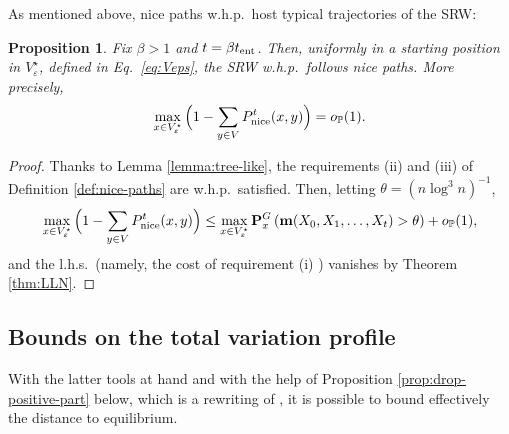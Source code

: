 \documentclass[11pt,oneside]{amsart}
\numberwithin{equation}{section}  %
\theoremstyle{plain}
\newtheorem{proposition}[theorem]{Proposition}
\newcommand{\whp}{{w.h.p.~}}
\newcommand{\lhs}{{l.h.s.~}}
\newcommand{\eps}{\varepsilon}
\newcommand{\p}{\mathbb{P}}
\newcommand{\op}{o_{\p}}
\newcommand{\tent}{t_{\textup{ent}}}
\newcommand{\quenchG}{\mathbf{P}^G}
\newcommand{\veps}{V^{\star}_\eps}
\newcommand{\mass}{\textup{\textbf{m}}}
\begin{document}
%	
	As mentioned above, nice paths \whp host typical trajectories of the SRW:
	\begin{proposition} \label{prop:nice-paths}
		Fix $\beta>1$ and $t=\beta\tent$. Then, uniformly in a starting position in $\veps$, defined in  Eq.\ \eqref{eq:Veps}, the SRW \whp follows nice paths. More precisely, 
        $$\max_{x \in \veps} \Big(1-\sum_{y \in V}P_{\rm nice}^t(x,y)\Big) = \op(1).$$
	\end{proposition}
	\begin{proof}
		Thanks to Lemma \ref{lemma:tree-like}, the requirements (ii) and (iii) of Definition \ref{def:nice-paths} are \whp satisfied. Then, letting 
        $\theta=({n \log^3 n})^{-1}$,
    	\begin{equation}
		\max_{x \in \veps} \Big(1-\sum_{y \in V}P_{\rm nice}^t(x,y)\Big) 
		\le \max_{x \in \veps} \quenchG_x\left(\mass(X_0,X_1,\dots,X_t)>\theta\right)+\op(1),
		\end{equation}
		and the \lhs (namely, the cost of requirement (i) ) vanishes by Theorem \ref{thm:LLN}.
	\end{proof}
	\subsection{Bounds on the total variation profile}
    With the latter tools at hand and with the help of Proposition \ref{prop:drop-positive-part} below, which is a rewriting of \cite[Prop. 3]{BP}, it is possible to bound effectively the distance to equilibrium.
	
\end{document}
